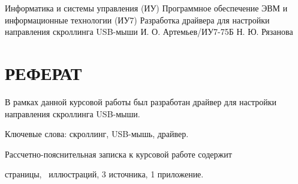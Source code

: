 \documentclass{bmstu}
\begin{document}
\makecourseworktitle
{Информатика и системы управления (ИУ)}
{Программное обеспечение ЭВМ и информационные технологии (ИУ7)}
{Разработка драйвера для настройки направления скроллинга USB-мыши}
{И. О. Артемьев/ИУ7-75Б}
{Н. Ю. Рязанова}
{}
{}
{}

\chapter*{РЕФЕРАТ}

В рамках данной курсовой работы был разработан драйвер для настройки направления скроллинга USB-мыши.

Ключевые слова: скроллинг, USB-мышь, драйвер.

Рассчетно-пояснительная записка к курсовой работе содержит \begin{NoHyper}\pageref{LastPage}\end{NoHyper} страницы, \totfig~иллюстраций, 3 источника, 1 приложение.

\clearpage

\maketableofcontents




\end{document}
